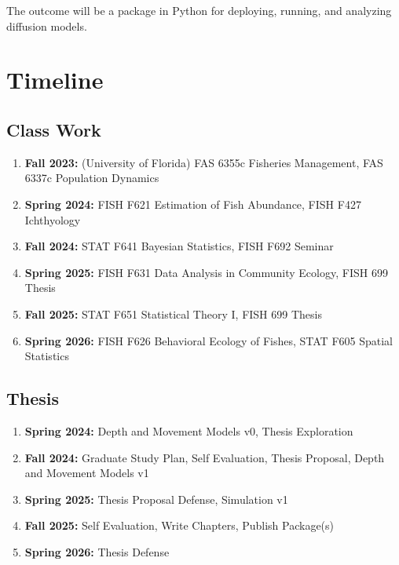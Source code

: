 \documentclass[11pt]{article}
\begin{document}
The outcome will be a package in Python for deploying, running, and analyzing diffusion models. 





\newpage



\section{Timeline}

\subsection{Class Work}

\begin{enumerate}
\item \textbf{Fall 2023:} (University of Florida) FAS 6355c Fisheries Management, FAS 6337c Population Dynamics
\item \textbf{Spring 2024:} FISH F621 Estimation of Fish Abundance, FISH F427 Ichthyology
\item \textbf{Fall 2024:} STAT F641 Bayesian Statistics, FISH F692 Seminar
\item \textbf{Spring 2025:} FISH F631 Data Analysis in Community Ecology, FISH 699 Thesis 
\item \textbf{Fall 2025:} STAT F651 Statistical Theory I, FISH 699 Thesis
\item \textbf{Spring 2026:} FISH F626  Behavioral Ecology of Fishes, STAT F605 Spatial Statistics 
\end{enumerate}

\subsection{Thesis}

\begin{enumerate}
\item \textbf{Spring 2024:} Depth and Movement Models v0, Thesis Exploration
\item \textbf{Fall 2024:} Graduate Study Plan, Self Evaluation, Thesis Proposal, Depth and Movement Models v1
\item \textbf{Spring 2025:} Thesis Proposal Defense, Simulation v1
\item \textbf{Fall 2025:} Self Evaluation, Write Chapters, Publish Package(s)
\item \textbf{Spring 2026:} Thesis Defense
\end{enumerate}
\end{document}
